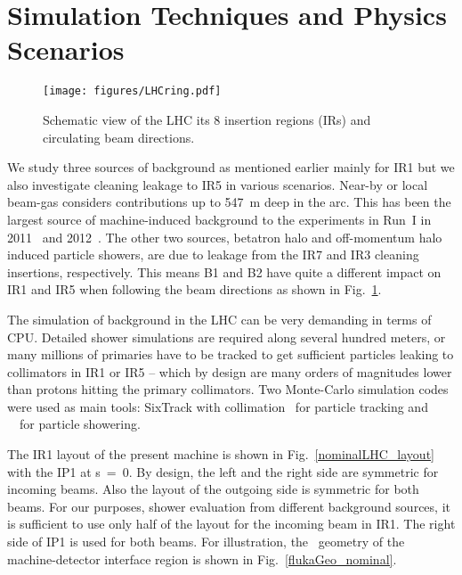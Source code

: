 \section{Simulation Techniques and Physics Scenarios\label{simSetup}}


\begin{figure}%
\begin{center}
\texttt{[image: figures/LHCring.pdf]}
\end{center}
\vspace{-0.6cm}
 \caption{Schematic view of the LHC its 8 insertion regions (IRs) and circulating beam directions.
  \label{LHCring}}
\end{figure}

We study three sources of background as mentioned earlier mainly for IR1 but we also investigate cleaning leakage to IR5 in various scenarios. Near-by or local beam-gas considers contributions up to 547~m deep in the arc. This has been the largest source of machine-induced background to the experiments in Run~I in 2011~\cite{nimPaperRod} and 2012~\cite{atlasBKGPaper2012}. The other two sources, betatron halo and off-momentum halo induced particle showers, are due to leakage from the IR7 and IR3 cleaning insertions, respectively. This means B1 and B2 have quite a different impact on IR1 and IR5 when following the beam directions as shown in Fig.~\ref{LHCring}.

The simulation of background in the LHC can be very demanding in terms of CPU. Detailed shower simulations are required along several hundred meters, or many millions of primaries have to be tracked to get sufficient particles leaking to collimators in IR1 or IR5 -- which by design are many orders of magnitudes lower than protons hitting the primary collimators. Two Monte-Carlo simulation codes were used as main tools: SixTrack with collimation~\cite{SixTrackRef} for particle tracking and \fluka~\cite{flukaRef1,flukaRef2}~for particle showering.

The IR1 layout of the present machine is shown in Fig.~\ref{nominalLHC_layout} with the IP1 at s~=~0. By design, the left and the right side are symmetric for incoming beams. Also the layout of the outgoing side is symmetric for both beams. For our purposes, shower evaluation from different background sources, it is sufficient to use only half of the layout for the incoming beam in IR1. The right side of IP1 is used for both beams. For illustration, the \fluka~geometry of the machine-detector interface region is shown in Fig.~\ref{flukaGeo_nominal}.


